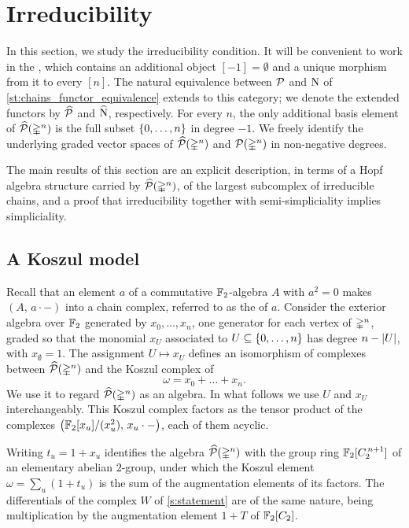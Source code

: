 \section{Irreducibility}\label{s:irreducible}

In this section, we study the irreducibility condition.
It will be convenient to work in the , which contains an additional object \([-1] = \emptyset\) and a unique morphism from it to every \([n]\).
The natural equivalence between $\mathcal{P}$ and $\operatorname{N}$ of \cref{st:chains_functor_equivalence} extends to this category; we denote the extended functors by $\widehat{\mathcal{P}}$ and $\widehat{\operatorname{N}}$, respectively.
For every $n$, the only additional basis element of $\widehat{\mathcal{P}}(\mathbb{\Delta}^n)$ is the full subset $\{0,\dots,n\}$ in degree $-1$.
We freely identify the underlying graded vector spaces of $\widehat{\mathcal{P}}(\mathbb{\Delta}^n)$ and $\mathcal{P}(\mathbb{\Delta}^n)$ in non-negative degrees.

The main results of this section are an explicit description, in terms of a Hopf algebra structure carried by $\widehat{\mathcal{P}}(\mathbb{\Delta}^n)$, of the largest subcomplex of irreducible chains, and a proof that irreducibility together with semi-simpliciality implies simpliciality.

\subsection{A Koszul model}

Recall that an element $a$ of a commutative ${\mathbb{F}_2}$-algebra $A$ with $a^2 = 0$ makes $(A,\, a \cdot -)$ into a chain complex, referred to as the  of $a$.
Consider the exterior algebra over ${\mathbb{F}_2}$ generated by $x_0, \dots, x_n$, one generator for each vertex of $\mathbb{\Delta}^n$, graded so that the monomial $x_U$ associated to $U \subseteq \{0,\dots,n\}$ has degree $n - \lvert U\rvert$, with $x_\emptyset = 1$.
The assignment $U \mapsto x_U$ defines an isomorphism of complexes between $\widehat{\mathcal{P}}(\mathbb{\Delta}^n)$ and the Koszul complex of
\[
\omega = x_0 + \dots + x_n.
\]
We use it to regard $\widehat{\mathcal{P}}(\mathbb{\Delta}^n)$ as an algebra.
In what follows we use $U$ and $x_U$ interchangeably.
This Koszul complex factors as the tensor product of the complexes $\big({\mathbb{F}_2}[x_u]/(x_u^2),\, x_u \cdot -\big)$, each of them acyclic.

\begin{remark*}\label{r:group_ring}
	Writing $t_u = 1 + x_u$ identifies the algebra $\widehat{\mathcal{P}}(\mathbb{\Delta}^n)$ with the group ring ${\mathbb{F}_2}[C_2^{\, n+1}]$ of an elementary abelian $2$-group, under which the Koszul element $\omega = \sum_u (1 + t_u)$ is the sum of the augmentation elements of its factors.
	The differentials of the complex $W$ of \cref{s:statement} are of the same nature, being multiplication by the augmentation element $1 + T$ of ${\mathbb{F}_2}[C_2]$.
\end{remark*}


